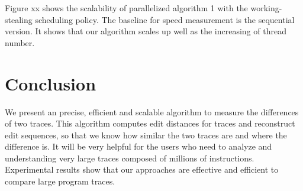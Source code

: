 \documentclass[10pt,journal,cspaper,compsoc]{IEEEtran}
\begin{document}
Figure xx shows the scalability of parallelized algorithm 1 with the working-stealing scheduling policy.
The baseline for speed measurement is the sequential version. It shows that our algorithm scales up well as the increasing of thread number.

\section{Conclusion}
We present an precise, efficient and scalable algorithm to measure the
differences of two traces. This algorithm computes edit distances
for traces and reconstruct edit sequences, so that we know how
similar the two traces are and where the difference is. It will be
very helpful for the users who need to analyze and understanding
very large traces composed of millions of instructions. Experimental results show that our
approaches are effective and efficient to compare large program traces.



%


\end{document}

